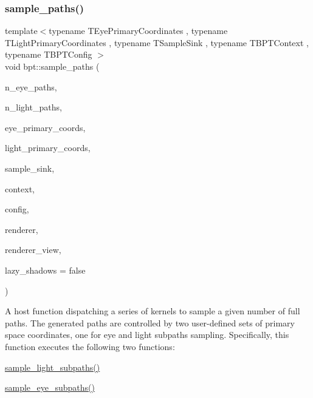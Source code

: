 \subsubsection{\texorpdfstring{sample\+\_\+paths()}{sample\_paths()}}
{\footnotesize\ttfamily template$<$typename T\+Eye\+Primary\+Coordinates , typename T\+Light\+Primary\+Coordinates , typename T\+Sample\+Sink , typename T\+B\+P\+T\+Context , typename T\+B\+P\+T\+Config $>$ \\
void bpt\+::sample\+\_\+paths (\begin{DoxyParamCaption}\item[{const uint32}]{n\+\_\+eye\+\_\+paths,  }\item[{const uint32}]{n\+\_\+light\+\_\+paths,  }\item[{T\+Eye\+Primary\+Coordinates}]{eye\+\_\+primary\+\_\+coords,  }\item[{T\+Light\+Primary\+Coordinates}]{light\+\_\+primary\+\_\+coords,  }\item[{T\+Sample\+Sink}]{sample\+\_\+sink,  }\item[{T\+B\+P\+T\+Context \&}]{context,  }\item[{const T\+B\+P\+T\+Config \&}]{config,  }\item[{\hyperlink{struct_rendering_context}{Rendering\+Context} \&}]{renderer,  }\item[{\hyperlink{struct_rendering_context_view}{Rendering\+Context\+View} \&}]{renderer\+\_\+view,  }\item[{const bool}]{lazy\+\_\+shadows = {\ttfamily false} }\end{DoxyParamCaption})}

\begin{DoxyParagraph}{}
A host function dispatching a series of kernels to sample a given number of full paths. The generated paths are controlled by two user-\/defined sets of primary space coordinates, one for eye and light subpaths sampling. Specifically, this function executes the following two functions\+: ~\newline

\begin{DoxyItemize}
\item \hyperlink{group___b_p_t_lib_ga679afc8704a42ed1c8e6b57018cd676e}{sample\+\_\+light\+\_\+subpaths()}
\item \hyperlink{group___b_p_t_lib_ga5dcb245a5dfa3a0910069446d27aa8eb}{sample\+\_\+eye\+\_\+subpaths()}
\end{DoxyItemize}
\end{DoxyParagraph}

